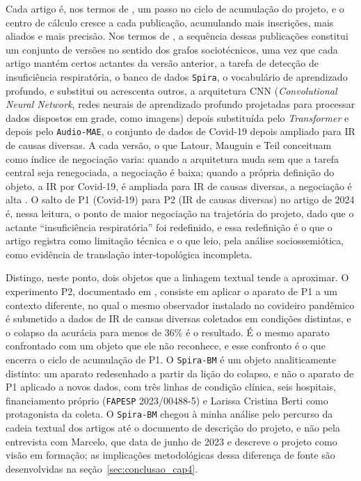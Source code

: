 Cada artigo é, nos termos de \textcite{Latour2011CienciaEmAcao}, um passo no ciclo de acumulação do projeto, e o centro de cálculo cresce a cada publicação, acumulando mais inscrições, mais aliados e mais precisão. Nos termos de \textcite{LatourMauguinTeil1992}, a sequência dessas publicações constitui um conjunto de versões no sentido dos grafos sociotécnicos, uma vez que cada artigo mantém certos actantes da versão anterior, a tarefa de detecção de insuficiência respiratória, o banco de dados \texttt{Spira}, o vocabulário de aprendizado profundo, e substitui ou acrescenta outros, a arquitetura CNN (\textit{Convolutional Neural Network}, redes neurais de aprendizado profundo projetadas para processar dados dispostos em grade, como imagens) depois substituída pelo \textit{Transformer} e depois pelo \texttt{\texttt{Audio-MAE}}, o conjunto de dados de Covid-19 depois ampliado para IR de causas diversas. A cada versão, o que Latour, Mauguin e Teil conceituam como índice de negociação varia: quando a arquitetura muda sem que a tarefa central seja renegociada, a negociação é baixa; quando a própria definição do objeto, a IR por Covid-19, é ampliada para IR de causas diversas, a negociação é alta \parencite[pp.~48--49]{LatourMauguinTeil1992}. O salto de P1 (Covid-19) para P2 (IR de causas diversas) no artigo de 2024 é, nessa leitura, o ponto de maior negociação na trajetória do projeto, dado que o actante \enquote{insuficiência respiratória} foi redefinido, e essa redefinição é o que o artigo registra como limitação técnica e o que leio, pela análise sociossemiótica, como evidência de translação inter-topológica incompleta.

Distingo, neste ponto, dois objetos que a linhagem textual tende a aproximar. O experimento P2, documentado em \textcite{Gauy2024Discriminant}, consiste em aplicar o aparato de P1 a um contexto diferente, no qual o mesmo observador instalado no covideiro pandêmico é submetido a dados de IR de causas diversas coletados em condições distintas, e o colapso da acurácia para menos de 36\% é o resultado. É o mesmo aparato confrontado com um objeto que ele não reconhece, e esse confronto é o que encerra o ciclo de acumulação de P1. O \texttt{Spira-BM} \parencite{Finger2025SPIRABM} é um objeto analiticamente distinto: um aparato redesenhado a partir da lição do colapso, e não o aparato de P1 aplicado a novos dados, com três linhas de condição clínica, seis hospitais, financiamento próprio (\texttt{FAPESP} 2023/00488-5) e Larissa Cristina Berti como protagonista da coleta. O \texttt{Spira-BM} chegou à minha análise pelo percurso da cadeia textual dos artigos até o documento de descrição do projeto, e não pela entrevista com Marcelo, que data de junho de 2023 e descreve o projeto como visão em formação; as implicações metodológicas dessa diferença de fonte são desenvolvidas na seção~\ref{sec:conclusao_cap4}.

